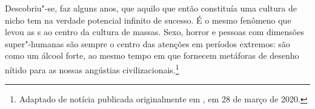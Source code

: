 \begin{changemargin}
Descobriu"-se, faz alguns anos, que aquilo que então constituía uma cultura de nicho tem na verdade potencial infinito de sucesso. É o mesmo fenômeno que levou as s ao centro da cultura de massas. Sexo, horror e pessoas com dimensões super"-humanas são sempre o centro das atenções em períodos extremos: são como um álcool forte, ao mesmo tempo em que fornecem metáforas de desenho nítido para as nossas angústias civilizacionais.\footnote{Adaptado de notícia publicada originalmente em {}, em 28 de março de 2020.} 


%
%
%
%
%
%
%
%
%

\pagebreak

\end{changemargin}

\pagebreak

